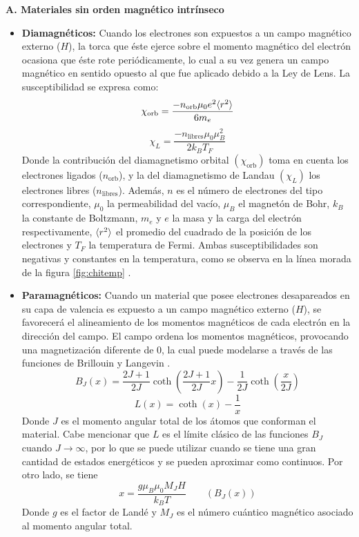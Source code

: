 \documentclass[../main.tex]{subfiles}
\begin{document}
\textbf{A. Materiales sin orden magnético intrínseco}
\begin{itemize}
    \item \textbf{Diamagnéticos:} Cuando los electrones son expuestos a un campo magnético externo ($H$), la torca que éste ejerce sobre el momento magnético del electrón ocasiona que éste rote periódicamente, lo cual a su vez genera un campo magnético en sentido opuesto al que fue aplicado debido a la Ley de Lens. La susceptibilidad se expresa como:
    \begin{equation}
        \chi_{\text{orb}}=\dfrac{-n_{\text{orb}}\mu_0e^2\langle r^2 \rangle}{6m_e}
        \label{eq:chidiamagorb}
    \end{equation}
    \begin{equation}
        \chi_L=\dfrac{-n_\text{libres}\mu_0\mu_B^2}{2k_BT_F}
        \label{eq:chidiamaglandau}
    \end{equation}
    Donde la contribución del diamagnetismo orbital $(\chi_\text{orb})$ toma en cuenta los electrones ligados ($n_\text{orb}$), y la del diamagnetismo de Landau $(\chi_L)$ los electrones libres ($n_\text{libres}$). Además, $n$ es el número de electrones del tipo correspondiente, $\mu_0$ la permeabilidad del vacío, $\mu_B$ el magnetón de Bohr, $k_B$ la constante de Boltzmann, $m_e$ y $e$ la masa y la carga del electrón respectivamente, $\langle r^2 \rangle$ el promedio del cuadrado de la posición de los electrones y $T_F$ la temperatura de Fermi. Ambas susceptibilidades son negativas y constantes en la temperatura, como se observa en la línea morada de la figura \ref{fig:chitemp} \cite{coey2010magnetism}.
    \item \textbf{Paramagnéticos:} Cuando un material que posee electrones desapareados en su capa de valencia es expuesto a un campo magnético externo ($H$), se favorecerá el alineamiento de los momentos magnéticos de cada electrón en la dirección del campo. El campo ordena los momentos magnéticos, provocando una magnetización diferente de 0, la cual puede modelarse a través de las funciones de Brillouin y Langevin \cite{coey2010magnetism}.
    \begin{equation}
        B_J(x)=\dfrac{2J+1}{2J}\coth\left(\dfrac{2J+1}{2J}x\right)-\dfrac{1}{2J}\coth\left(\dfrac{x}{2J}\right)
        \label{eq:Brillouin}
    \end{equation}
    \begin{equation}
        L(x)=\coth(x)-\dfrac{1}{x}
        \label{eq:Langevin}
    \end{equation}
    Donde $J$ es el momento angular total de los átomos que conforman el material. Cabe mencionar que $L$ es el límite clásico de las funciones $B_J$ cuando $J\rightarrow\infty$, por lo que se puede utilizar cuando se tiene una gran cantidad de estados energéticos y se pueden aproximar como continuos. Por otro lado, se tiene
    \begin{equation}
        x=\dfrac{g\mu_B\mu_0M_JH}{k_BT}\qquad (B_J(x))
        \label{eq:xBrillouin}
    \end{equation}
    Donde $g$ es el factor de Landé y $M_J$ es el número cuántico magnético asociado al momento angular total.


\end{itemize}
\end{document}
